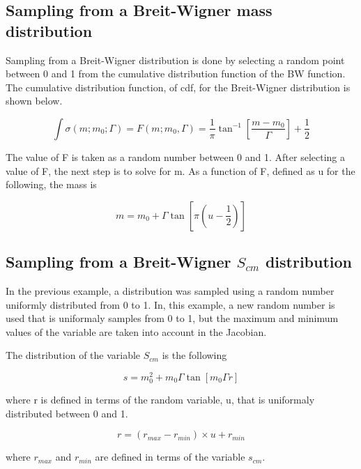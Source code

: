 \subsection{Sampling from a Breit-Wigner mass distribution}

Sampling from a Breit-Wigner distribution is done by selecting a random point
between 0 and 1 from the cumulative distribution function of the BW
function. The cumulative distribution function, of cdf, for the Breit-Wigner
distribution is shown below.

\begin{equation}
\label{sample}
\int \sigma(m;m_{0};\Gamma) = F(m;m_{0},\Gamma) = \frac{1}{\pi} \tan^{-1} \left[
\frac{m-m_{0}}{\Gamma} \right] + \frac{1}{2}
\end{equation}

The value of F is taken as a random number between 0 and 1. After selecting a
value of F, the next step is to solve for m. As a function of F, defined as u for
the following, the mass is 


\begin{equation}
m = m_{0} + \Gamma \tan \left[ \pi(u - \frac{1}{2}) \right]
\end{equation}

\subsection{Sampling from a Breit-Wigner $S_{cm}$ distribution}

In the previous example, a distribution was sampled using a random number
uniformly distributed from 0 to 1. In, this example, a new random number is used
that is uniformaly samples from 0 to 1, but the maximum and minimum values of
the variable are taken into account in the Jacobian.

The distribution of the variable $S_{cm}$ is the following

\begin{equation}
\label{defines}
s = m_{0}^{2} + m_{0}\Gamma \tan \left[ m_{0} \Gamma r \right]
\end{equation}

where r is defined in terms of the random variable, u, that is uniformaly
distributed between 0 and 1.

\begin{equation}
\label{rtou}
r = (r_{max} - r_{min}) \times u + r_{min}
\end{equation}

where $r_{max}$ and $r_{min}$ are defined in terms of the variable $s_{cm}$.

